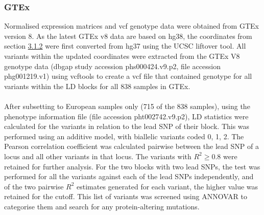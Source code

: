\documentclass{article}
\begin{document}
\subsubsection{GTEx}
\label{subsec:GTEx}
Normalised expression matrices and vcf genotype data were obtained from GTEx version 8. As the latest GTEx v8 data are based on hg38, the coordinates from section \hyperref[subsubsec:LDblock]{3.1.2} were first converted from hg37 using the UCSC liftover tool\cite{Hinrichs2006The2006.}. All variants within the updated coordinates were extracted from the GTEx V8 genotype data (dbgap study accession phs000424.v9.p2, file accession phg001219.v1) using vcftools\cite{Danecek2011TheVCFtools} to create a vcf file that contained genotype for all variants within the LD blocks for all 838 samples in GTEx.
\\
\\After subsetting to European samples only (715 of the 838 samples), using the phenotype information file (file accession pht002742.v9.p2), LD statistics were calculated for the variants in relation to the lead SNP of their block. This was performed using an additive model, with biallelic variants coded 0, 1, 2. The Pearson correlation coefficient was calculated pairwise between the lead SNP of a locus and all other variants in that locus. The variants with $R^2\geq0.8$ were retained for further analysis. For the two blocks with two lead SNPs, the test was performed for all the variants against each of the lead SNPs independently, and of the two pairwise $R^2$ estimates generated for each variant, the higher value was retained for the cutoff. This list of variants was screened using ANNOVAR\cite{Wang2010ANNOVAR:Data} to categorise them and search for any protein-altering mutations. 
\\
\end{document}
